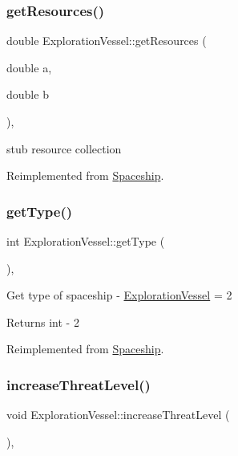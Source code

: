 \subsubsection{\texorpdfstring{get\+Resources()}{getResources()}}
{\footnotesize\ttfamily double Exploration\+Vessel\+::get\+Resources (\begin{DoxyParamCaption}\item[{double}]{a,  }\item[{double}]{b }\end{DoxyParamCaption})\hspace{0.3cm}{\ttfamily [inline]}, {\ttfamily [virtual]}}

stub resource collection 

Reimplemented from \hyperlink{classSpaceship_ad2027533de1d789db5e3efa22055f2d0}{Spaceship}.

\mbox{\label{classExplorationVessel_ab06e219200100bbd40a8f79702e52ae8}} 
\subsubsection{\texorpdfstring{get\+Type()}{getType()}}
{\footnotesize\ttfamily int Exploration\+Vessel\+::get\+Type (\begin{DoxyParamCaption}{ }\end{DoxyParamCaption})\hspace{0.3cm}{\ttfamily [inline]}, {\ttfamily [virtual]}}

Get type of spaceship -\/ \hyperlink{classExplorationVessel}{Exploration\+Vessel} = 2 \begin{DoxyReturn}{Returns}
int -\/ 2 
\end{DoxyReturn}


Reimplemented from \hyperlink{classSpaceship_a113055e6d793f8fbc55e44efc4d57e07}{Spaceship}.

\mbox{\label{classExplorationVessel_a2f164fa9477a2624c5f04b4d9d84ec84}} 
\subsubsection{\texorpdfstring{increase\+Threat\+Level()}{increaseThreatLevel()}}
{\footnotesize\ttfamily void Exploration\+Vessel\+::increase\+Threat\+Level (\begin{DoxyParamCaption}{ }\end{DoxyParamCaption})\hspace{0.3cm}{\ttfamily [inline]}, {\ttfamily [virtual]}}

